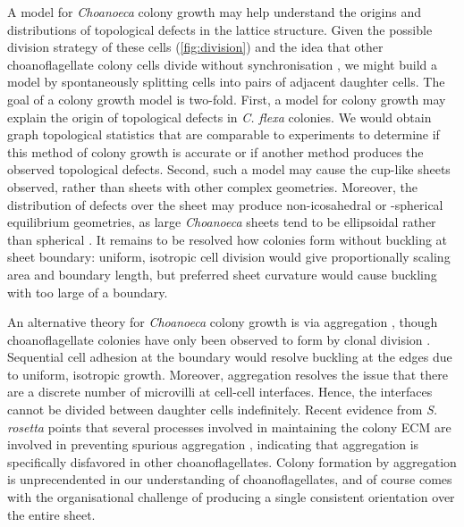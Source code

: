 A model for \textit{Choanoeca} colony growth may help understand the origins and distributions of topological defects in the lattice structure. 
Given the possible division strategy of these cells (\cref{fig:division}) and the idea that other choanoflagellate colony cells divide without synchronisation \citep{larson2020}, we might build a model by spontaneously splitting cells into pairs of adjacent daughter cells.
The goal of a colony growth model is two-fold.
First, a model for colony growth may explain the origin of topological defects in \textit{C. flexa} colonies.
We would obtain graph topological statistics that are comparable to experiments to determine if this method of colony growth is accurate or if another method produces the observed topological defects.
Second, such a model may cause the cup-like sheets observed, rather than sheets with other complex geometries.
Moreover, the distribution of defects over the sheet may produce non-icosahedral or -spherical equilibrium geometries, as large \textit{Choanoeca} sheets tend to be ellipsoidal rather than spherical \citep{leadbeater1983,brunet2019}.
It remains to be resolved how colonies form without buckling at sheet boundary: uniform, isotropic cell division would give proportionally scaling area and boundary length, but preferred sheet curvature would cause buckling with too large of a boundary.

An alternative theory for \textit{Choanoeca} colony growth is via aggregation \citep{grosberg2007}, though choanoflagellate colonies have only been observed to form by clonal division \citep{fairclough2010,alegado2012,woznica2016}.
Sequential cell adhesion at the boundary would resolve buckling at the edges due to uniform, isotropic growth.
Moreover, aggregation resolves the issue that there are a discrete number of microvilli at cell-cell interfaces.
Hence, the interfaces cannot be divided between daughter cells indefinitely.
Recent evidence from \textit{S. rosetta} points that several processes involved in maintaining the colony ECM are involved in preventing spurious aggregation \citep{wetzel2018}, indicating that aggregation is specifically disfavored in other choanoflagellates.
Colony formation by aggregation is unprecendented in our understanding of choanoflagellates, and of course comes with the organisational challenge of producing a single consistent orientation over the entire sheet.

